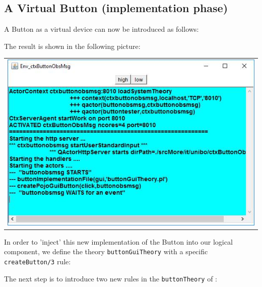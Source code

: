 

\subsection{A Virtual Button (implementation phase)}
A Button as a virtual device can now be introduced as follows:


The result is shown in the following picture:

\begin{center}
\begin{tabular}{ c }
     \includegraphics[scale = 0.45]{./img/buttonGui.jpg}\\
\end{tabular}{   }
\end{center}

In order to 'inject' this new implementation of the Button into our logical component, we define the theory \texttt{buttonGuiTheory} with a specific \texttt{createButton/3} rule: 




The next step is to introduce two new rules in  the \texttt{buttonTheory} of :

